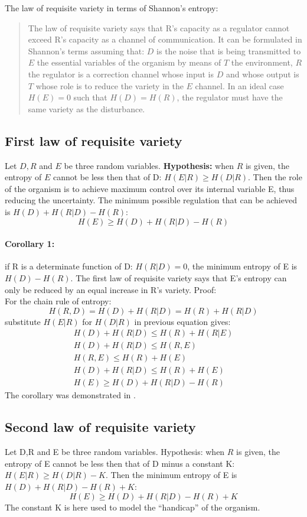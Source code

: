 The law of requisite variety in terms of Shannon's entropy:
\begin{quotation}
The law of requisite variety says that R's capacity as a regulator cannot
exceed R's capacity as a channel of communication.
It can be formulated in Shannon's terms assuming that: $D$ is the noise that is
 being transmitted to $E$ the essential variables of the organism by means of $T$
the environment, $R$ the regulator is a correction channel whose input is $D$ and
whose output is $T$ whose role is to reduce the variety in the $E$ channel.
In an ideal case $H(E)=0$ such that $H(D)=H(R)$, the regulator must have
the same variety as the disturbance. 
\end{quotation}

\subsection{First law of requisite variety}
Let $D,R$ and $E$ be three random variables.
\textbf{Hypothesis:} when $R$ is given, the entropy of $E$ cannot be less then that of D: $H(E|R)\geq H(D|R)$.
Then the role of the organism is to achieve maximum control over its internal variable E,
thus reducing the uncertainty.
The minimum possible regulation that can be achieved is $H(D)+H(R|D)-H(R)$:
\begin{equation}
H(E)\geq H(D)+H(R|D)-H(R) \label{variety:eq:minh}
\end{equation}
\paragraph{Corollary 1:}
if R is a determinate function of D: $H(R|D)=0$, the minimum entropy of E is $H(D)-H(R)$.
The first law of requisite variety says that E's entropy can only be reduced by
 an equal increase in R's variety.
Proof:\\
For the chain rule of entropy:
\begin{equation}
H(R,D)=H(D)+H(R|D)=H(R)+H(R|D)
\end{equation}
substitute $H(E|R)$ for $H(D|R)$ in previous equation gives:
\begin{eqnarray}
H(D)+H(R|D) \leq H(R)+H(R|E)\\
H(D)+H(R|D) \leq H(R,E)\\
H(R,E) \leq H(R)+H(E)\\
H(D) +H(R|D)\leq H(R)+H(E)\\
H(E) \geq H(D) +H(R|D)-H(R)
\end{eqnarray}
The corollary was demonstrated in \citet{Ashby1956:IntroCybernetics}.

\subsection{Second law of requisite variety}
Let D,R and E be three random variables.
Hypothesis: when $R$ is given, the entropy of E cannot be less then that of
 D minus a constant K: $H(E|R)\geq H(D|R)-K$.
Then the minimum entropy of E is $H(D)+H(R|D)-H(R)+K$:
\begin{equation}
H(E)\geq H(D)+H(R|D)-H(R)+K
\end{equation}
The constant K is here used to model the ``handicap'' of the organism.


